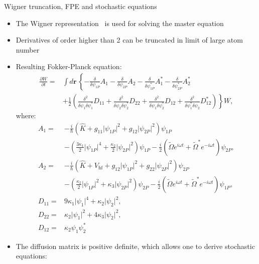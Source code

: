 \documentclass[final,hyperref={pdfpagelabels=false}]{beamer}
\begin{document}
\begin{frame}
\begin{columns}
{\begin{block}{Wigner truncation, FPE and stochastic equations}
\begin{itemize}
	\item The Wigner representation~\cite{gardiner} is used for solving the master equation
	\item Derivatives of order higher than 2 can be truncated in limit of large atom number~\cite{norrie}~\cite{sinatra}
	\item Resulting Fokker-Planck equation:
\begin{equation*}
\begin{split}
\frac{\partial W}{\partial t} = & \int d\mathbf{r}\, \left\{
	- \frac{\delta}{\delta \psi_{1P}} A_1 -
	\frac{\delta}{\delta \psi_{2P}} A_2 -
	\frac{\delta}{\delta \psi^*_{1P}} A^*_1 -
	\frac{\delta}{\delta \psi^*_{2P}} A^*_2
\right. \\
& \left. + \frac{1}{2} \left(
	\frac{\delta^2}{\delta \psi_1 \delta \psi_1^*} D_{11} +
	\frac{\delta^2}{\delta \psi_2 \delta \psi_2^*} D_{22} +
	\frac{\delta^2}{\delta \psi_1 \delta \psi_2^*} D_{12} +
	\frac{\delta^2}{\delta \psi_1^* \delta \psi_2} D^*_{12} \right)
\right\} W,
\end{split}
\end{equation*}
where:
\begin{align*}
A_1 = {} & -\frac{i}{\hbar} \left( \hat{K} + g_{11} \lvert \psi_{1P} \rvert^2 + g_{12} \lvert \psi_{2P} \rvert^2 \right) \psi_{1P} \\
	& - \left( \frac{3 \kappa_1}{2} \lvert \psi_{1P} \rvert^4 + \frac{\kappa_2}{2} \lvert \psi_{2P} \rvert^2 \right) \psi_{1P} -
	\frac{i}{2} \left( \tilde{\Omega} e^{i \omega t} + \tilde{\Omega}^* e^{-i \omega t} \right) \psi_{2P}, \\
A_2 = {} & -\frac{i}{\hbar} \left( \hat{K} + V_{\textrm{hf}} +
	g_{12} \lvert \psi_{1P} \rvert^2 + g_{22} \lvert \psi_{2P} \rvert^2 \right) \psi_{2P} \\
	& - \left( \frac{\kappa_2}{2} \lvert \psi_{1P} \rvert^2 + \kappa_3 \lvert \psi_{2P} \rvert^2 \right) \psi_{2P} -
	\frac{i}{2} \left( \tilde{\Omega} e^{i \omega t} + \tilde{\Omega}^* e^{-i \omega t} \right) \psi_{1P}, \\
D_{11} = {} & 9 \kappa_1 \lvert \psi_1 \rvert^4 + \kappa_2 \lvert \psi_2 \rvert^2, \\
D_{22} = {} & \kappa_2 \lvert \psi_1 \rvert^2 + 4 \kappa_3 \lvert \psi_2 \rvert^2, \\
D_{12} = {} & \kappa_2 \psi_1 \psi_2^*
\end{align*}
	\item The diffusion matrix is positive definite, which allows one to derive stochastic equations:

\end{itemize}
\end{block}}
\end{columns}
\end{frame}
\end{document}
